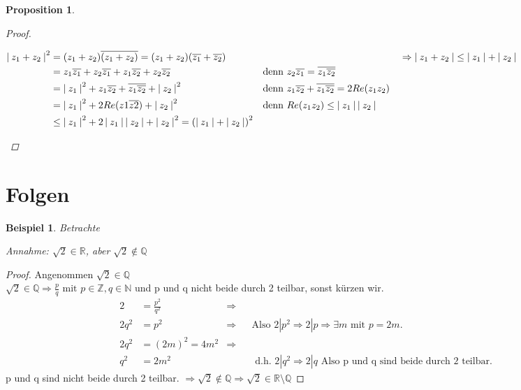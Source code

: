 \documentclass[a4paper,titlepage,oneside]{article}
\def\N{\ensuremath{\mathbb{N}} }
\def\Q{\ensuremath{\mathbb{Q}} }
\def\Z{\ensuremath{\mathbb{Z}} }
\def\R{\ensuremath{\mathbb{R}} }
\def\WSP{\text{Widerspruch! }}
\newcommand{\abs}[1]{\ensuremath{\left|\:#1\:\right|}}
\theoremstyle{thmstyle}
\newtheorem{prop}[satz]{Proposition}
\newtheorem{bsp}[satz]{Beispiel}
\theoremstyle{subthmstyle}
\begin{document}
\begin{prop}
\begin{proof}
\begin{enumerate}[label=(\roman*)]
\begin{math}
\begin{aligned}[t]
\end{aligned}\\
\begin{aligned}[t]
\abs{z_1 + z_2}^2 &= (z_1 + z_2)\overline{(z_1 + z_2)} = (z_1 + z_2)(\overline{z_1} + \overline{z_2}) \\
&= z_1\overline{z_1} + z_2\overline{z_1} + z_1\overline{z_2} + z_2\overline{z_2} &&\text{denn } z_2\overline{z_1} = \overline{z_1\overline{z_2}} \\
&= \abs{z_1}^2 + z_1\overline{z_2} + \overline{z_1\overline{z_2}} + \abs{z_2}^2 &&\text{denn } z_1\overline{z_2} + \overline{z_1\overline{z_2}} = 2Re(z_1z_2) \\
&= \abs{z_1}^2 + 2 Re(z1 \overline{z2}) + \abs{z_2}^2 &&\text{denn } Re(z_1z_2) \le \abs{z_1}\abs{z_2}\\
&\le  \abs{z_1}^2 + 2\abs{z_1}\abs{z_2} + \abs{z_2}^2 = \left(\abs{z_1} + \abs{z_2}\right)^2
\end{aligned}\\
\Rightarrow \abs{z_1 + z_2} \le \abs{z_1} + \abs{z_2}
\end{math}
\end{enumerate}
\end{proof}
\end{prop}

\newpage
\section{Folgen}

\begin{bsp}
Betrachte
\begin{center}  \end{center}
Annahme: \( \sqrt{2} \in \R\), aber \(\sqrt{2} \not\in \Q\)
\end{bsp}
\begin{proof} Angenommen $\displaystyle \sqrt{2} \in \Q$ \\
$ \displaystyle \sqrt{2} \in \Q \Rightarrow \frac{p}{q} \text{ mit }p \in \Z, q \in \N $ und p und q nicht beide durch 2 teilbar, sonst kürzen wir.
\begin{align*}
2 &= \frac{p^2}{q^2} &\Rightarrow\\
2q^2 &= p^2 &\Rightarrow &&\text{Also } 2 | p^2 \Rightarrow 2 | p \Rightarrow \exists m \text{ mit } p = 2 m. \\
2q^2 &= (2m)^2 = 4m^2 &\Rightarrow \\
q^2 &= 2m^2 & &&\text{ d.h. } 2 | q^2 \Rightarrow 2 | q \text{ Also p und q sind beide durch 2 teilbar.}
\end{align*}
 \WSP p und q sind nicht beide durch 2 teilbar. $\displaystyle \Rightarrow \sqrt{2} \not\in \Q \Rightarrow \sqrt{2} \in \R\setminus\Q$
\end{proof}
\end{document}
